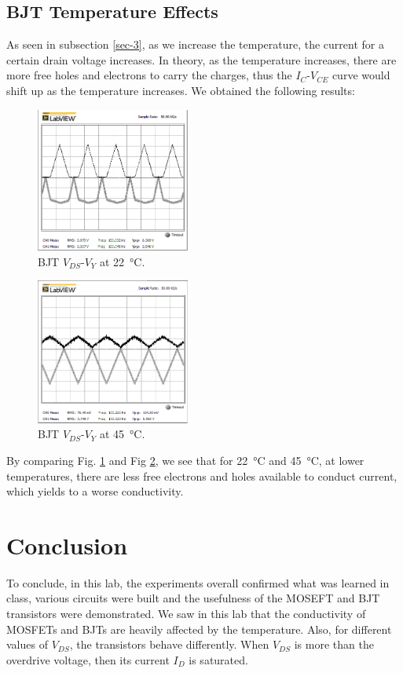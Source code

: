 \documentclass[journal]{IEEEtran}
\begin{document}
\subsection{BJT Temperature Effects}
\par As seen in subsection \ref{sec-3}, as we increase the temperature, the
current for a certain drain voltage increases. In theory, as
the temperature increases, there are more free holes and
electrons to carry the charges, thus the $I_{C}$-$V_{CE}$ curve would
shift up as the temperature increases. We obtained the following results:
\begin{figure}[h]
  \centering
  \includegraphics[width=0.45\textwidth]{images/4-1.png}
  \caption{BJT $V_{DS}$-$V_{Y}$ at \SI{22}{\celsius}.}
  \label{fig-9}
\end{figure}
\begin{figure}[h]
  \centering
  \includegraphics[width=0.45\textwidth]{images/4-2.png}
  \caption{BJT $V_{DS}$-$V_{Y}$ at \SI{45}{\celsius}.}
  \label{fig-10}
\end{figure}
\par By comparing Fig. \ref{fig-9} and Fig \ref{fig-10}, we see that for \SI{22}{\celsius}
and \SI{45}{\celsius}, at lower temperatures, there are less
free electrons and holes available to conduct current, which yields to a worse conductivity.
\section{Conclusion}
\par To conclude, in this lab, the experiments overall confirmed what was learned in class, various circuits were built and the usefulness of the MOSEFT and BJT transistors were demonstrated.
We saw in this lab that the conductivity of MOSFETs and BJTs are heavily affected by the temperature. Also, for different values of $V_{DS}$, the transistors behave differently. When $V_{DS}$ is more than the overdrive voltage, then its current  $I_{D}$ is saturated.
\end{document}
